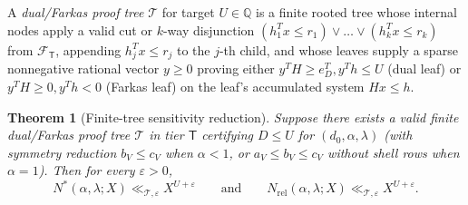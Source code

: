 \documentclass[11pt,a4paper]{amsart}
\theoremstyle{plain}
\newtheorem{theorem}{Theorem}[section]
\theoremstyle{definition}
\theoremstyle{remark}
\newcommand{\Q}{\mathbb{Q}}
\newcommand{\eps}{\varepsilon}
\begin{document}
A \emph{dual/Farkas proof tree} $\mathcal{T}$ for target $U \in \Q$ is a finite rooted tree whose internal nodes apply a valid cut or $k$-way disjunction $(h_1^T x \le r_1) \lor \dots \lor (h_k^T x \le r_k)$ from $\mathcal{F}_{\mathsf{T}}$, appending $h_j^T x \le r_j$ to the $j$-th child, and whose leaves supply a sparse nonnegative rational vector $y \ge 0$ proving either $y^T H \ge e_D^T, y^T h \le U$ (dual leaf) or $y^T H \ge 0, y^T h < 0$ (Farkas leaf) on the leaf's accumulated system $H x \le h$.

\begin{theorem}[Finite-tree sensitivity reduction]\label{thm:reduction}
Suppose there exists a valid finite dual/Farkas proof tree $\mathcal{T}$ in tier $\mathsf{T}$ certifying $D \le U$ for $(d_0, \alpha, \lambda)$ (with symmetry reduction $b_V \le c_V$ when $\alpha < 1$, or $a_V \le b_V \le c_V$ without shell rows when $\alpha = 1$). Then for every $\eps > 0$,
\[
  N^*(\alpha,\lambda;X) \ll_{\mathcal{T},\eps} X^{U + \eps}
  \qquad\text{and}\qquad
  N_{\mathrm{rel}}(\alpha,\lambda;X) \ll_{\mathcal{T},\eps} X^{U + \eps}.
\]
\end{theorem}
\end{document}
